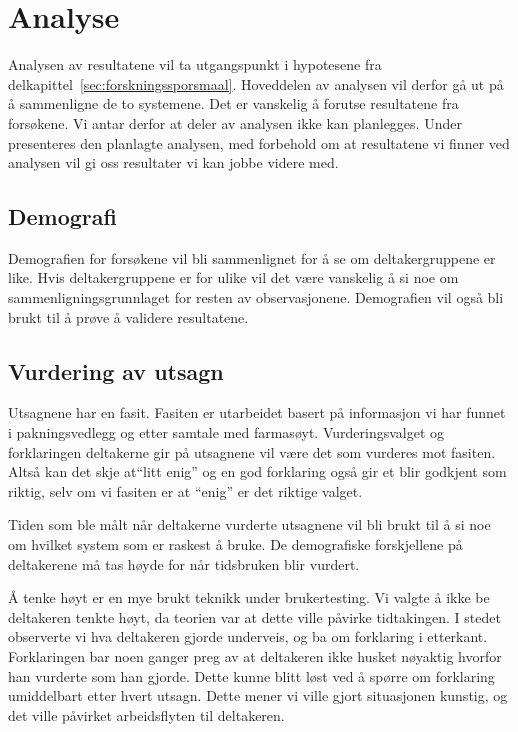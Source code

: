 \section{Analyse}
Analysen av resultatene vil ta utgangspunkt i hypotesene fra delkapittel~\ref{sec:forskningssporsmaal}. Hoveddelen av analysen vil derfor gå ut på å sammenligne de to systemene. Det er vanskelig å forutse resultatene fra forsøkene. Vi antar derfor at deler av analysen ikke kan planlegges. Under presenteres den planlagte analysen, med forbehold om at resultatene vi finner ved analysen vil gi oss resultater vi kan jobbe videre med.  

\subsection{Demografi}
Demografien for forsøkene vil bli sammenlignet for å se om deltakergruppene er like. Hvis deltakergruppene er for ulike vil det være vanskelig å si noe om sammenligningsgrunnlaget for resten av observasjonene. Demografien vil også bli brukt til å prøve å validere resultatene. 

\subsection{Vurdering av utsagn}
Utsagnene har en fasit. Fasiten er utarbeidet basert på informasjon vi har funnet i pakningsvedlegg og etter samtale med farmasøyt. Vurderingsvalget og forklaringen deltakerne gir på utsagnene vil være det som vurderes mot fasiten. Altså kan det skje at``litt enig'' og en god forklaring også gir et blir godkjent som riktig, selv om vi fasiten er at ``enig'' er det riktige valget.

Tiden som ble målt når deltakerne vurderte utsagnene vil bli brukt til å si noe om hvilket system som er raskest å bruke. De demografiske forskjellene på deltakerene må tas høyde for når tidsbruken blir vurdert. 

Å tenke høyt er en mye brukt teknikk under brukertesting. Vi valgte å ikke be deltakeren tenkte høyt, da teorien var at dette ville påvirke tidtakingen. I stedet observerte vi hva deltakeren gjorde underveis, og ba om forklaring i etterkant. Forklaringen bar noen ganger preg av at deltakeren ikke husket nøyaktig hvorfor han vurderte som han gjorde. Dette kunne blitt løst ved å spørre om forklaring umiddelbart etter hvert utsagn. Dette mener vi ville gjort situasjonen kunstig, og det ville påvirket arbeidsflyten til deltakeren. 

